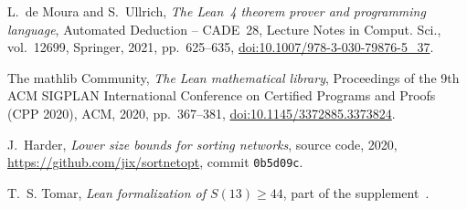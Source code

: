 L.~de Moura and S.~Ullrich, \emph{The Lean~4 theorem prover and programming language}, Automated
Deduction -- CADE~28, Lecture Notes in Comput. Sci., vol.~12699, Springer, 2021, pp.~625--635,
\href{https://doi.org/10.1007/978-3-030-79876-5_37}{doi:10.1007/978-3-030-79876-5\_37}.

The mathlib Community, \emph{The Lean mathematical library}, Proceedings of the 9th ACM SIGPLAN International
Conference on Certified Programs and Proofs (CPP 2020), ACM, 2020, pp.~367--381,
\href{https://doi.org/10.1145/3372885.3373824}{doi:10.1145/3372885.3373824}.

J.~Harder, \emph{Lower size bounds for sorting networks}, source code, 2020,
\url{https://github.com/jix/sortnetopt}, commit \texttt{0b5d09c}.

T.~S. Tomar, \emph{Lean formalization of $S(13)\ge44$}, part of the supplement~\cite{Supp}.
